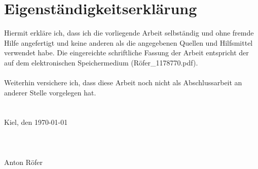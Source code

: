 \section*{Eigenständigkeitserklärung}

Hiermit erkläre ich, dass ich die vorliegende Arbeit selbständig und ohne fremde Hilfe 
angefertigt und keine anderen als die angegebenen Quellen und Hilfsmittel verwendet 
habe. Die eingereichte schriftliche Fassung der Arbeit entspricht der auf dem elektronischen Speichermedium (Röfer\_1178770.pdf). \\
\\
Weiterhin versichere ich, dass diese Arbeit noch nicht als Abschlussarbeit an anderer 
Stelle vorgelegen hat. \\
\\
\\
Kiel, den \today\\
\\
\\
\\
Anton Röfer